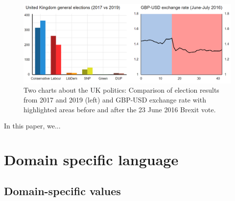 \documentclass{jfp}
\begin{document}
\begin{figure}
  \includegraphics[scale=0.57]{figures/charts}
  \vspace{0.25em}
  \caption{Two charts about the UK politics: Comparison of election results from 2017 and 2019 (left)
    and GBP-USD exchange rate with highlighted areas before and after the 23 June 2016 Brexit vote.}
  \label{fig:charts}
\end{figure}

In this paper, we...

\newpage


\section{Domain specific language}
\label{sec:intro}
\subsection*{Domain-specific values}
\end{document}
